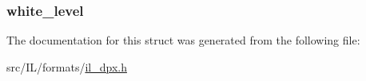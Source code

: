 \hypertarget{struct_d_p_x___t_e_l_e_v_i_s_i_o_n___h_e_a_d_a4ce86269be48fa4c85a94d9d31d92612}{
\subsubsection[{white\-\_\-level}]{ white\-\_\-level}}\label{struct_d_p_x___t_e_l_e_v_i_s_i_o_n___h_e_a_d_a4ce86269be48fa4c85a94d9d31d92612}


The documentation for this struct was generated from the following file\-:\begin{DoxyCompactItemize}
\item 
src/\-I\-L/formats/\hyperlink{il__dpx_8h}{il\-\_\-dpx.\-h}\end{DoxyCompactItemize}
